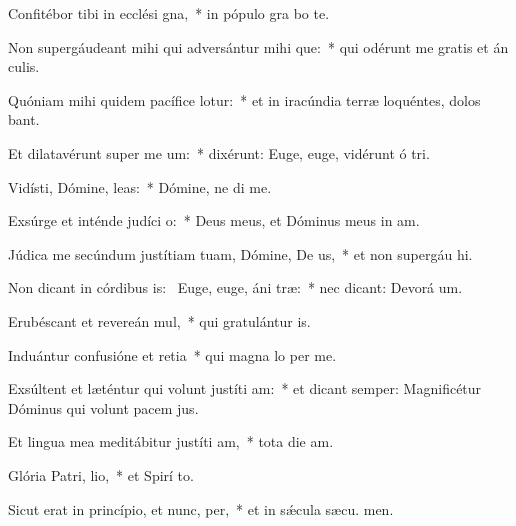 \item Confitébor tibi in ecclési gna,~* in pópulo gra bo te.
\item Non supergáudeant mihi qui adversántur mihi que:~* qui odérunt me gratis et án culis.
\item Quóniam mihi quidem pacífice lotur:~* et in iracúndia terræ loquéntes, dolos bant.
\item Et dilatavérunt super me  um:~* dixérunt: Euge, euge, vidérunt ó tri.
\item Vidísti, Dómine,  leas:~* Dómine, ne di  me.
\item Exsúrge et inténde judíci o:~* Deus meus, et Dóminus meus in  am.
\item Júdica me secúndum justítiam tuam, Dómine, De us,~* et non supergáu hi.
\item Non dicant in córdibus is:~\pscross{} Euge, euge, áni træ:~* nec dicant: Devorá um.
\item Erubéscant et revereán mul,~* qui gratulántur  is.
\item Induántur confusióne et retia~* qui magna lo per me.
\item Exsúltent et læténtur qui volunt justíti am:~* et dicant semper: Magnificétur Dóminus qui volunt pacem  jus.
\item Et lingua mea meditábitur justíti am,~* tota die  am.
\item Glória Patri,  lio,~* et Spirí to.
\item Sicut erat in princípio, et nunc,  per,~* et in sǽcula sæcu. men.
